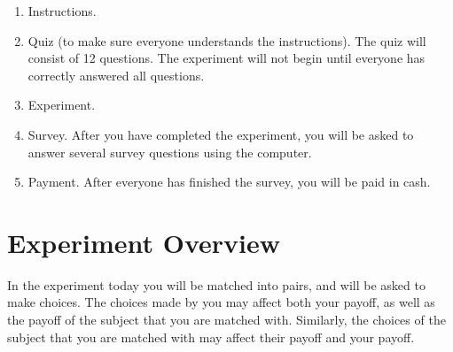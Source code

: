 \documentclass[11pt]{article}
\newcommand{\dblbkt}[1]{}
\begin{document}
\begin{enumerate} 
\dblbkt{1} \item Instructions.
\dblbkt{1} \item Quiz (to make sure everyone understands the instructions).  The quiz will consist of 12 questions.  The experiment will not begin until everyone has correctly answered all questions.
\dblbkt{1} \item Experiment. 
\dblbkt{1} \item Survey. After you have completed the experiment, you will be asked to answer several survey questions using the computer.  
\dblbkt{1} \item Payment. After everyone has finished the survey, you will be paid in cash.
\end{enumerate} 


\section*{\dblbkt{3} Experiment Overview}

In the experiment today you will be \dblbkt{1} matched into pairs, and will be asked to make choices.  The choices made by you may \dblbkt{1} affect both your payoff, as well as \dblbkt{1} the payoff of the subject that you are matched with.  Similarly, the choices of the subject that you are matched with may \dblbkt{1} affect their payoff and your payoff.
\end{document}
